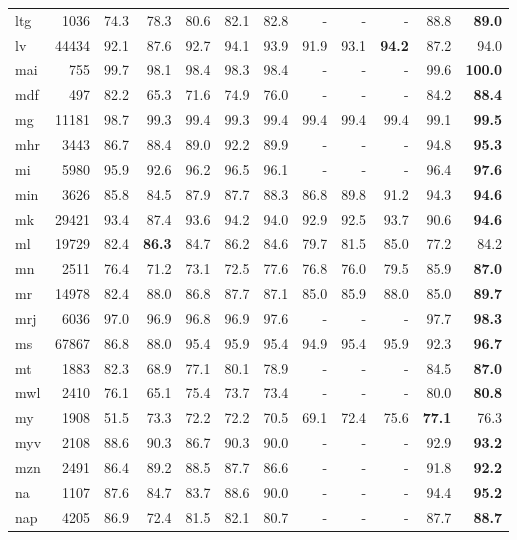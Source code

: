 \documentclass[11pt,a4paper]{article}
\begin{document}
\begin{supertabular}{lrrr|rrr|rrr|rr}
ltg & 1036 & 74.3 & 78.3 & 80.6 & 82.1 & 82.8 & - & - & - & 88.8 & \textbf{89.0}\\
lv & 44434 & 92.1 & 87.6 & 92.7 & 94.1 & 93.9 & 91.9 & 93.1 & \textbf{94.2} & 87.2 & 94.0\\
mai & 755 & 99.7 & 98.1 & 98.4 & 98.3 & 98.4 & - & - & - & 99.6 & \textbf{100.0}\\
mdf & 497 & 82.2 & 65.3 & 71.6 & 74.9 & 76.0 & - & - & - & 84.2 & \textbf{88.4}\\
mg & 11181 & 98.7 & 99.3 & 99.4 & 99.3 & 99.4 & 99.4 & 99.4 & 99.4 & 99.1 & \textbf{99.5}\\
mhr & 3443 & 86.7 & 88.4 & 89.0 & 92.2 & 89.9 & - & - & - & 94.8 & \textbf{95.3}\\
mi & 5980 & 95.9 & 92.6 & 96.2 & 96.5 & 96.1 & - & - & - & 96.4 & \textbf{97.6}\\
min & 3626 & 85.8 & 84.5 & 87.9 & 87.7 & 88.3 & 86.8 & 89.8 & 91.2 & 94.3 & \textbf{94.6}\\
mk & 29421 & 93.4 & 87.4 & 93.6 & 94.2 & 94.0 & 92.9 & 92.5 & 93.7 & 90.6 & \textbf{94.6}\\
ml & 19729 & 82.4 & \textbf{86.3} & 84.7 & 86.2 & 84.6 & 79.7 & 81.5 & 85.0 & 77.2 & 84.2\\
mn & 2511 & 76.4 & 71.2 & 73.1 & 72.5 & 77.6 & 76.8 & 76.0 & 79.5 & 85.9 & \textbf{87.0}\\
mr & 14978 & 82.4 & 88.0 & 86.8 & 87.7 & 87.1 & 85.0 & 85.9 & 88.0 & 85.0 & \textbf{89.7}\\
mrj & 6036 & 97.0 & 96.9 & 96.8 & 96.9 & 97.6 & - & - & - & 97.7 & \textbf{98.3}\\
ms & 67867 & 86.8 & 88.0 & 95.4 & 95.9 & 95.4 & 94.9 & 95.4 & 95.9 & 92.3 & \textbf{96.7}\\
mt & 1883 & 82.3 & 68.9 & 77.1 & 80.1 & 78.9 & - & - & - & 84.5 & \textbf{87.0}\\
mwl & 2410 & 76.1 & 65.1 & 75.4 & 73.7 & 73.4 & - & - & - & 80.0 & \textbf{80.8}\\
my & 1908 & 51.5 & 73.3 & 72.2 & 72.2 & 70.5 & 69.1 & 72.4 & 75.6 & \textbf{77.1} & 76.3\\
myv & 2108 & 88.6 & 90.3 & 86.7 & 90.3 & 90.0 & - & - & - & 92.9 & \textbf{93.2}\\
mzn & 2491 & 86.4 & 89.2 & 88.5 & 87.7 & 86.6 & - & - & - & 91.8 & \textbf{92.2}\\
na & 1107 & 87.6 & 84.7 & 83.7 & 88.6 & 90.0 & - & - & - & 94.4 & \textbf{95.2}\\
nap & 4205 & 86.9 & 72.4 & 81.5 & 82.1 & 80.7 & - & - & - & 87.7 & \textbf{88.7}\\

\end{supertabular}
\end{document}
